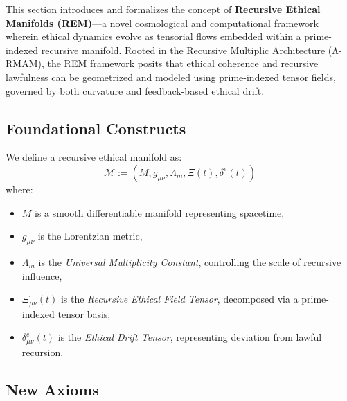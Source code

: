\documentclass{article}
\theoremstyle{plain}
\begin{document}
This section introduces and formalizes the concept of \textbf{Recursive Ethical Manifolds (REM)}---a novel cosmological and computational framework wherein ethical dynamics evolve as tensorial flows embedded within a prime-indexed recursive manifold. Rooted in the Recursive Multiplic Architecture (Λ-RMAM), the REM framework posits that ethical coherence and recursive lawfulness can be geometrized and modeled using prime-indexed tensor fields, governed by both curvature and feedback-based ethical drift.


\subsection{Foundational Constructs}

We define a recursive ethical manifold as:
\[
\mathcal{M} := (M, g_{\mu\nu}, \Lambda_m, \Xi(t), \delta^e(t))
\]
where:
\begin{itemize}
  \item $M$ is a smooth differentiable manifold representing spacetime,
  \item $g_{\mu\nu}$ is the Lorentzian metric,
  \item $\Lambda_m$ is the \textit{Universal Multiplicity Constant}, controlling the scale of recursive influence,
  \item $\Xi_{\mu\nu}(t)$ is the \textit{Recursive Ethical Field Tensor}, decomposed via a prime-indexed tensor basis,
  \item $\delta^e_{\mu\nu}(t)$ is the \textit{Ethical Drift Tensor}, representing deviation from lawful recursion.
\end{itemize}

\subsection{New Axioms}
\end{document}
